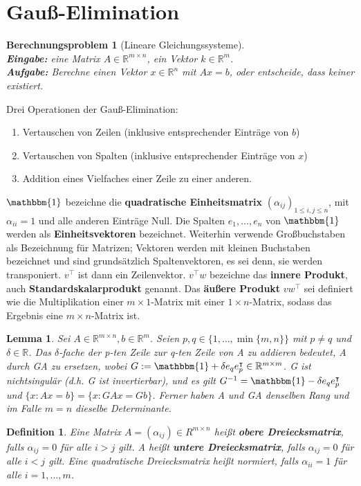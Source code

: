 \documentclass[12pt,a4paper]{article}
\theoremstyle{plain}
\newtheorem{Lemma}[Theorem]{Lemma}
\newtheorem{Definition}[Theorem]{Definition}
\newtheorem{Berechnungsproblem}[Theorem]{Berechnungsproblem}
\newcommand{\herv}[1]{{\emph{\textbf{#1}}}}
\newcommand{\R}{\mathbb{R}}
\numberwithin{equation}{section}
\begin{document}
\section{Gauß-Elimination}
\begin{Berechnungsproblem}[Lineare Gleichungssysteme]\\
\textbf{Eingabe:} eine Matrix $A\in \R^{m\times n}$, ein Vektor $k\in\R^m$.\\
\textbf{Aufgabe:} Berechne einen Vektor $x\in \R^n$ mit $Ax=b$, oder entscheide, dass keiner existiert.
\end{Berechnungsproblem}
Drei Operationen der Gauß-Elimination:
\begin{enumerate}
\renewcommand{\labelenumi}{(\arabic{enumi})}
\item Vertauschen von Zeilen (inklusive entsprechender Einträge von $b$)
\item Vertauschen von Spalten (inklusive entsprechender Einträge von $x$)
\item Addition eines Vielfaches einer Zeile zu einer anderen.
\end{enumerate}
$\mathbbm{1}$ bezeichne die \textbf{quadratische Einheitsmatrix} $(\alpha_{ij})_{1\leq i,j\leq n}$, mit $\alpha_{ii}=1$ und alle anderen Einträge Null. Die Spalten $e_1,\ldots,e_n$ von $\mathbbm{1}$ werden als \textbf{Einheitsvektoren} bezeichnet. Weiterhin verwende Großbuchstaben als Bezeichnung für Matrizen; Vektoren werden mit kleinen Buchstaben bezeichnet und sind grundsätzlich Spaltenvektoren, es sei denn, sie werden transponiert. $v^\intercal$ ist dann ein Zeilenvektor. $v^\intercal w$ bezeichne das \textbf{innere Produkt}, auch \textbf{Standardskalarprodukt} genannt. Das \textbf{äußere Produkt} $v w^\intercal$ sei definiert wie die Multiplikation einer $m\times 1$-Matrix mit einer $1\times n$-Matrix, sodass das Ergebnis eine $m\times n$-Matrix ist.
\begin{Lemma}
Sei $A\in \R^{m\times n}, b\in \R^m$. Seien $p,q\in \{1,\ldots,\min\{m,n\}\}$ mit $p\neq q$ und $\delta\in \R$. Das $\delta$-fache der p-ten Zeile zur q-ten Zeile von A zu addieren bedeutet, A durch GA zu ersetzen, wobei $G:=\mathbbm{1}+\delta e_q e_p^\intercal \in \R^{m\times m}$. G ist nichtsingulär (d.h. G ist invertierbar), und es gilt $G^{-1}=\mathbbm{1}-\delta e_q e_p^\intercal$ und $\{x: Ax=b\}=\{x: GAx=Gb\}$. Ferner haben A und GA denselben Rang und im Falle $m=n$ dieselbe Determinante.
\end{Lemma}
\begin{Definition}
Eine Matrix $A=(\alpha_{ij})\in R^{m\times n}$ heißt \herv{obere Dreiecksmatrix}, falls $\alpha_{ij}=0$ für alle $i>j$ gilt. A heißt \herv{untere Dreiecksmatrix}, falls $\alpha_{ij}=0$ für alle $i<j$ gilt. Eine quadratische Dreiecksmatrix heißt normiert, falls $\alpha_{ii}=1$ für alle $i=1,\ldots,m$.
\end{Definition}
\end{document}
